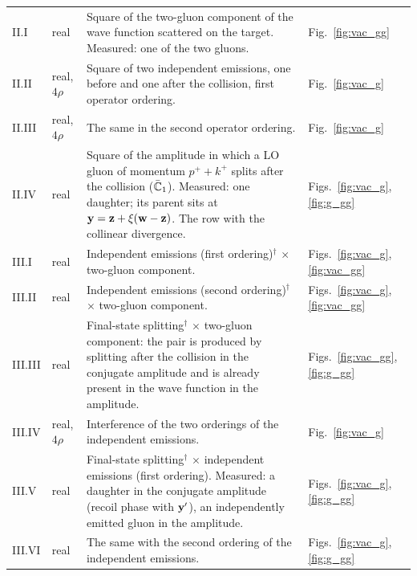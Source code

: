 \begin{longtable}{@{}l>{\raggedright\arraybackslash}p{}>{\raggedright\arraybackslash}p{}>{\raggedright\arraybackslash}p{}@{}}
\midrule
II.I & real & Square of the two-gluon component of the wave function scattered on the target. Measured: one of the two gluons. & Fig.~\ref{fig:vac_gg}\\
II.II & real, $4\rho$ & Square of two independent emissions, one before and one after the collision, first operator ordering. & Fig.~\ref{fig:vac_g}\\
II.III & real, $4\rho$ & The same in the second operator ordering. & Fig.~\ref{fig:vac_g}\\
II.IV & real & Square of the amplitude in which a LO gluon of momentum $p^++k^+$ splits after the collision ($\bar{\mathbb{C}}_1$). Measured: one daughter; its parent sits at $\mathbf{y}=\mathbf{z}+\xi(\mathbf{w}-\mathbf{z})$. The row with the collinear divergence. & Figs.~\ref{fig:vac_g}, \ref{fig:g_gg}\\
\midrule
III.I & real & Independent emissions (first ordering)$^\dagger$ $\times$ two-gluon component. & Figs.~\ref{fig:vac_g}, \ref{fig:vac_gg}\\
III.II & real & Independent emissions (second ordering)$^\dagger$ $\times$ two-gluon component. & Figs.~\ref{fig:vac_g}, \ref{fig:vac_gg}\\
III.III & real & Final-state splitting$^\dagger$ $\times$ two-gluon component: the pair is produced by splitting after the collision in the conjugate amplitude and is already present in the wave function in the amplitude. & Figs.~\ref{fig:vac_gg}, \ref{fig:g_gg}\\
III.IV & real, $4\rho$ & Interference of the two orderings of the independent emissions. & Fig.~\ref{fig:vac_g}\\
III.V & real & Final-state splitting$^\dagger$ $\times$ independent emissions (first ordering). Measured: a daughter in the conjugate amplitude (recoil phase with $\mathbf{y}'$), an independently emitted gluon in the amplitude. & Figs.~\ref{fig:vac_g}, \ref{fig:g_gg}\\
III.VI & real & The same with the second ordering of the independent emissions. & Figs.~\ref{fig:vac_g}, \ref{fig:g_gg}\\
\end{longtable}
\endgroup

